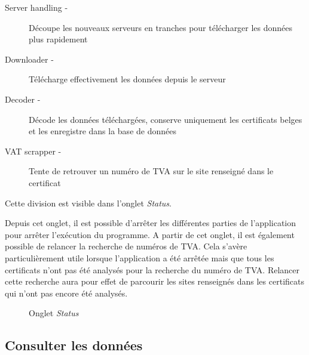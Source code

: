 \documentclass{article}
\begin{document}
\begin{description}
\item[Server handling -] Découpe les nouveaux serveurs en tranches pour télécharger les données plus rapidement
\item[Downloader -] Télécharge effectivement les données depuis le serveur
\item[Decoder -] Décode les données téléchargées, conserve uniquement les certificats belges et les enregistre dans la base de données
\item[VAT scrapper -] Tente de retrouver un numéro de TVA sur le site renseigné dans le certificat
\end{description}

Cette division est visible dans l'onglet \emph{Status}.

Depuis cet onglet, il est possible d'arrêter les différentes parties de l'application pour arrêter l'exécution du programme.  A partir de cet onglet, il est également possible de relancer la recherche de numéros de TVA.  Cela s'avère particulièrement utile lorsque l'application a été arrêtée mais que tous les certificats n'ont pas été analysés pour la recherche du numéro de TVA.  Relancer cette recherche aura pour effet de parcourir les sites renseignés dans les certificats qui n'ont pas encore été analysés.

\begin{figure}
\noindent{}
\caption{Onglet \emph{Status}}
\label{status-fig}
\end{figure}


\subsection{Consulter les données}
\end{document}
